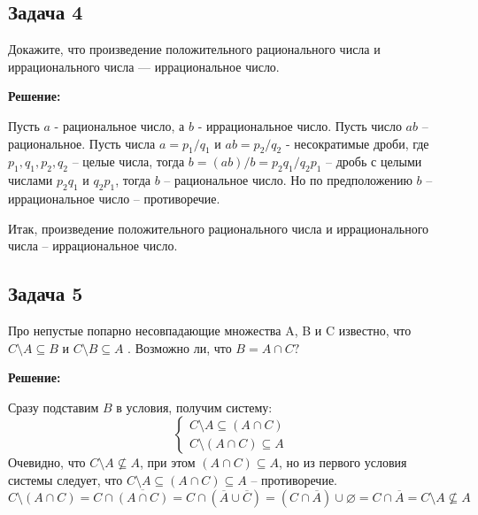 \documentclass[a4paper,14pt]{article} %
\begin{document}
\begin{flushright}
\begin{large}
\textbf {}
\end{large}
\end{flushright}

\begin{center}
\subsection{Задача 4}
\end{center}

Докажите, что произведение положительного рационального числа и иррационального числа — иррациональное число.
\begin{center}
\bfseries
{\Large Решение: }
\end{center}


Пусть $a$ - рациональное число, а $b$ - иррациональное число. Пусть число $ab$ -- рациональное. Пусть числа $a = p_1/q_1$ и $ab = p_2/q_2$ - несократимые дроби, где $p_1, q_1, p_2, q_2$ -- целые числа, тогда $b = (ab)/b = p_2q_1/q_2p_1 $ -- дробь с целыми числами $p_2q_1$ и $q_2p_1$, тогда $b$ -- рациональное число. Но по предположению $b$ -- иррациональное число -- противоречие.

Итак, произведение положительного рационального числа и иррационального числа -- иррациональное число.

\newpage
\begin{center}
\subsection{Задача 5}
\end{center}

Про непустые попарно несовпадающие множества A, B и C известно,
что $C \setminus A \subseteq B $ и $C \setminus B \subseteq A$ . Возможно ли, что $B = A \cap C?$


\begin{center}
\bfseries
{\Large Решение: }
\end{center}


Сразу подставим $B$ в условия, получим систему:
  \[\begin{cases}
 C \setminus A \subseteq (A \cap C)\\
 C \setminus (A \cap C) \subseteq A
\end{cases}\]
Очевидно, что $C \setminus A \nsubseteq A$, при этом $(A \cap C)\subseteq A$, но из первого условия системы следует, что $C \setminus A \subseteq (A \cap C) \subseteq A $ -- противоречие.
\[C \setminus (A \cap C) = C \cap \overline{(A \cap C)} = C \cap (\overline{A} \cup \overline{C}) = (C \cap \overline{A}) \cup \varnothing = C \cap \overline{A} = C \setminus A \nsubseteq A\]
\end{document}
